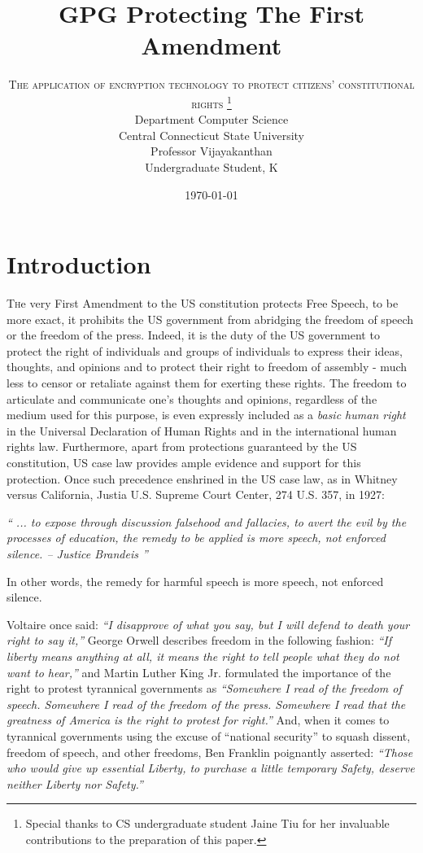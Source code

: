 \documentclass[twoside,twocolumn]{article}
\title{GPG Protecting The First Amendment} %
\author{%
  \textsc{The application of encryption technology to protect citizens' constitutional rights}
  \thanks{Special thanks to CS undergraduate student Jaine Tiu for her invaluable contributions to the preparation of this paper.} \\[1ex] %
  \normalsize Department Computer Science \\ Central Connecticut State University \\  Professor Vijayakanthan \\
  Undergraduate Student, K\\
}
\date{\today} %
\begin{document}
\maketitle


\section*{Introduction}



\lettrine[nindent=0em,lines=3]{T}he very First Amendment to the US constitution protects Free Speech, to be more exact, it prohibits the US government from abridging the freedom of speech or the freedom of the press\cite{firstamendment}.
Indeed, it is the duty of the US government to protect
the right of individuals and
groups of individuals
to express their ideas, thoughts, and opinions
and to protect their right to freedom of assembly
- much less to censor or retaliate against them for exerting these rights.
The freedom to articulate and communicate one's thoughts and opinions,
regardless of the medium used for this purpose,
is even
expressly included as a
\textit{basic human right} in the
Universal Declaration of Human Rights \cite{humanrights}
and in the international human rights law.
Furthermore,
apart from protections guaranteed by the US constitution,
US case law provides ample evidence and support for this protection.
Once such precedence enshrined in the US case law, as
in Whitney versus California\cite{whitney},
Justia U.S. Supreme Court Center, 274 U.S. 357, in 1927:

\textit{
\enquote{
... to expose through discussion falsehood and fallacies, to avert the evil by the processes of education, the remedy to be applied is more speech, not enforced silence. -- Justice Brandeis }}

In other words,
the remedy for harmful speech is more speech, not enforced silence.

Voltaire once said:
\textit{``I disapprove of what you say, but I will defend to death your right to say it,''}
George Orwell describes freedom in the following fashion:
\textit{ ``If liberty means anything at all, it means the right to tell people what they do not want to hear,''}
and
Martin Luther King Jr. formulated the importance of the right to protest tyrannical governments as
\textit{``Somewhere I read of the freedom of speech. Somewhere I read of the freedom of the press. Somewhere I read that the greatness of America is the right to protest for right.''}
And, when it comes to tyrannical governments using the excuse of ``national security'' to squash dissent, freedom of speech, and other freedoms,
Ben Franklin poignantly asserted:
\textit{``Those who would give up essential Liberty, to purchase a little temporary Safety, deserve neither Liberty nor Safety.''}
\end{document}
